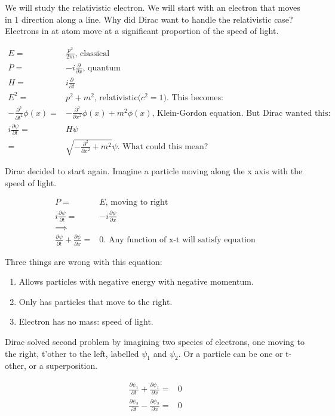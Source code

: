 \documentclass[]{article}
\begin{document}
We will study the relativistic electron. We will start with an electron that moves in 1 direction along a line. Why did Dirac want to handle the relativistic case? Electrons in at atom move at a significant proportion of the speed of light.  

\begin{align*}
E =& \frac{p^2}{2m} \text {, classical}\\
P =& -i \frac{\partial}{\partial x} \text{, quantum}\\
H = & i \frac{\partial}{\partial t}\\
E^2 =& p^2 + m^2 \text{, relativistic($c^2=1$). This becomes:}\\
-\frac{\partial^2}{\partial t^2} \phi(x) =& -\frac{\partial^2}{\partial x^2}\phi(x) + m^2 \phi(x) \text{, Klein-Gordon equation. But Dirac wanted this:}\\
i \frac{\partial \psi}{\partial t} =& H\psi\\
=& \sqrt{- \frac{\partial^2}{\partial x^2} + m^2} \psi \text{. What could this mean?}  
\end{align*}

Dirac decided to start again. Imagine a particle moving along the x axis with the speed of light.

\begin{align*}
P =& E \text{, moving to right}\\
i \frac{\partial \psi}{\partial t} =& -i \frac{\partial \psi}{\partial x}\\
\implies&\\
\frac{\partial \psi}{\partial t} + \frac{\partial \psi}{\partial x}=&0\text{. Any function of x-t will satisfy equation}
\end{align*}

Three things are wrong with this equation:
\begin{enumerate}
	\item Allows particles with negative energy with negative momentum.
	\item Only has particles that move to the right.
	\item Electron has no mass: speed of light.
\end{enumerate}

Dirac solved second problem by imagining two species of electrons, one moving to the right, t'other to the left, labelled $\psi_1$ and $\psi_2$. Or a particle can be one or t-other, or a superposition.

\begin{align*}
\frac{\partial \psi_1}{\partial t} + \frac{\partial \psi_1}{\partial x}=&0\\
\frac{\partial \psi_2}{\partial t} - \frac{\partial \psi_2}{\partial x}=&0
\end{align*}
\end{document}
